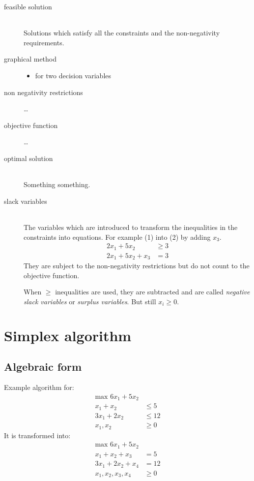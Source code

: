 \documentclass[a4paper, 12pt]{article}
\begin{document}
\begin{description}
\item[feasible solution] \hfill \\
    Solutions which satisfy all the constraints and the non-negativity
    requirements.

\item[graphical method] \hfill
    \begin{itemize}
    \item for two decision variables
    \end{itemize}
    
\item[non negativity restrictions] \ldots

\item[objective function] \ldots

\item[optimal solution] \hfill \\
    Something something.
    
\item[slack variables] \hfill \\
    The variables which are introduced to transform the inequalities in the
    constraints into equations. For example (1) into (2) by adding $x_3$.
    \begin{align}
        2x_1+5x_2&\ge3\\
        2x_1+5x_2+x_3&=3
    \end{align}
    They are subject to the non-negativity restrictions but do not count to the
    objective function.
    
    When $\ge$ inequalities are used, they are subtracted and are called
    \emph{negative slack variables} or \emph{surplus variables}. But still
    $x_i \ge 0$.

\end{description}

\section{Simplex algorithm}

\subsection{Algebraic form}

Example algorithm for:
\begin{align*}
    \text{max } 6x_1 + 5x_2 \\
    x_1 + x_2 &\le 5 \\
    3x_1 + 2x_2 &\le 12 \\
    x_1,x_2 &\ge 0
\end{align*}
It is transformed into:
\begin{align*}
    \text{max } 6x_1 + 5x_2 \\
    x_1 + x_2 + x_3 &= 5 \\
    3x_1 + 2x_2 + x_4 &= 12 \\
    x_1,x_2,x_3,x_4 &\ge 0
\end{align*}
\end{document}

